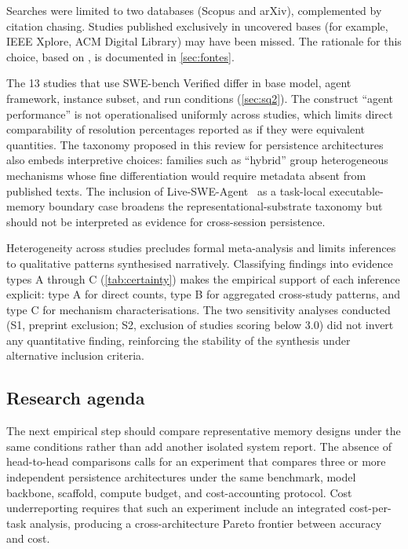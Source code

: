Searches were limited to two databases (Scopus and arXiv), complemented
by citation chasing.
Studies published exclusively in uncovered bases (for example, IEEE
Xplore, ACM Digital Library) may have been missed.
The rationale for this choice, based on \citet{mourao2020hybrid}, is
documented in \autoref{sec:fontes}.

The 13 studies that use SWE-bench Verified differ in base model, agent
framework, instance subset, and run conditions (\autoref{sec:sq2}).
The construct ``agent performance'' is not operationalised uniformly
across studies, which limits direct comparability of resolution
percentages reported as if they were equivalent quantities.
The taxonomy proposed in this review for persistence architectures also
embeds interpretive choices: families such as ``hybrid'' group
heterogeneous mechanisms whose fine differentiation would require
metadata absent from published texts.
The inclusion of Live-SWE-Agent~\citep{xia2025livesweagent} as a
task-local executable-memory boundary case broadens the
representational-substrate taxonomy but should not be interpreted as
evidence for cross-session persistence.

Heterogeneity across studies precludes formal meta-analysis and limits
inferences to qualitative patterns synthesised narratively.
Classifying findings into evidence types A through C
(\autoref{tab:certainty}) makes the empirical support of each inference
explicit: type A for direct counts, type B for aggregated cross-study
patterns, and type C for mechanism characterisations.
The two sensitivity analyses conducted (S1, preprint exclusion;
S2, exclusion of studies scoring below 3.0) did not invert any
quantitative finding, reinforcing the stability of the synthesis under
alternative inclusion criteria.

\subsection{Research agenda}
\label{sec:agenda-pesquisa}

The next empirical step should compare representative memory designs
under the same conditions rather than add another isolated system
report.
The absence of head-to-head comparisons calls for an experiment that
compares three or more independent persistence architectures under the
same benchmark, model backbone, scaffold, compute budget, and
cost-accounting protocol.
Cost underreporting requires that such an experiment include an
integrated cost-per-task analysis, producing a cross-architecture
Pareto frontier between accuracy and cost.

